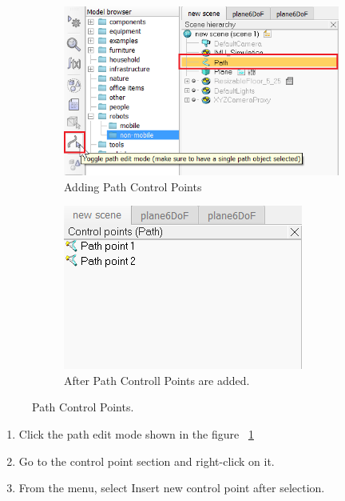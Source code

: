 \begin{figure}[h!]
  \centering
  \begin{subfigure}[b]{0.5\linewidth}
    \includegraphics[width=\linewidth]{figures/PathControllPoint.png}
    \caption{Adding Path Control Points}
  \end{subfigure}
\quad
\begin{subfigure}[b]{0.5\linewidth}
    \includegraphics[width=\linewidth]{figures/PathControllPointsPane.png}
    \caption{After Path Controll Points are added.}
  \end{subfigure}
 \caption{Path Control Points.}
  \label{fig:PathControlPoint}
\end{figure}

\begin{enumerate}
  \item Click the path edit mode shown in the figure ~\ref{fig:PathControlPoint}
  \item Go to the control point section and right-click on it.
  \item From the menu, select Insert new control point after selection.
\end{enumerate}

